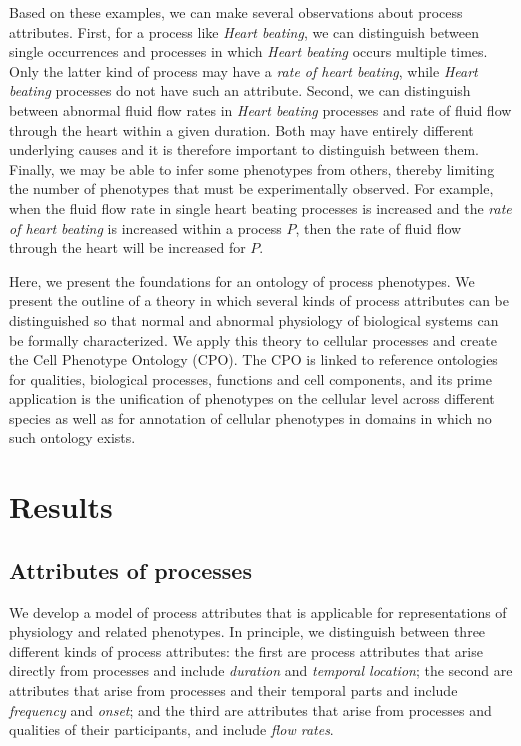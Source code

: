 \documentclass[11pt]{article}
\begin{document}
Based on these examples, we can make several observations about
process attributes. First, for a process like {\em Heart beating}, we
can distinguish between single occurrences and processes in which {\em
  Heart beating} occurs multiple times. Only the latter kind of
process may have a {\em rate of heart beating}, while {\em Heart
  beating} processes do not have such an attribute. Second, we can
distinguish between abnormal fluid flow rates in {\em Heart beating}
processes and rate of fluid flow through the heart within a given
duration. Both may have entirely different underlying causes and it is
therefore important to distinguish between them. Finally, we may be
able to infer some phenotypes from others, thereby limiting the number
of phenotypes that must be experimentally observed. For example, when
the fluid flow rate in single heart beating processes is increased and
the {\em rate of heart beating} is increased within a process $P$,
then the rate of fluid flow through the heart will be increased for
$P$.

Here, we present the foundations for an ontology of process
phenotypes. We present the outline of a theory in which several kinds
of process attributes can be distinguished so that normal and abnormal
physiology of biological systems can be formally characterized. We
apply this theory to cellular processes and create the Cell Phenotype
Ontology (CPO). The CPO is linked to reference ontologies for
qualities, biological processes, functions and cell components, and
its prime application is the unification of phenotypes on the cellular
level across different species as well as for annotation of cellular
phenotypes in domains in which no such ontology exists.

\section{Results}
\subsection{Attributes of processes}
We develop a model of process attributes that is applicable for
representations of physiology and related phenotypes. In principle, we
distinguish between three different kinds of process attributes: the
first are process attributes that arise directly from processes and
include {\em duration} and {\em temporal location}; the second are
attributes that arise from processes and their temporal parts and
include {\em frequency} and {\em onset}; and the third are attributes
that arise from processes and qualities of their participants, and
include {\em flow rates}.
\end{document}
